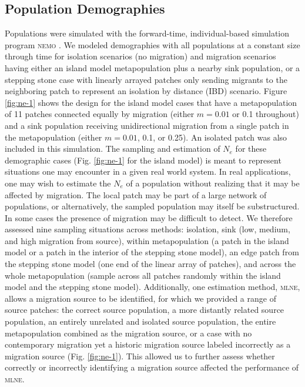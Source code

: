 \subsection{Population Demographies}
Populations were simulated with the forward-time, individual-based simulation program 
\textsc{nemo} \citep{Guillaume:2006}. We modeled demographies with all populations 
at a constant size through time for isolation scenarios (no migration) and migration scenarios 
having either an island model metapopulation plus a nearby sink population, or a stepping stone 
case with linearly arrayed patches only sending migrants to the neighboring patch to represent 
an isolation by distance (IBD) scenario. Figure \ref{fig:ne-1} shows the design for the island model cases 
that have a metapopulation of 11 patches connected equally by migration (either $m = 0.01$ or 0.1 throughout) 
and a sink population receiving unidirectional migration from a single patch in the metapopulation 
(either $m = 0.01$, 0.1, or 0.25). An isolated patch was also included in this simulation. The sampling 
and estimation of $N_e$ for these demographic cases (Fig. \ref{fig:ne-1} for the island model) is meant 
to represent situations one may encounter in a given real world system. In real applications, one 
may wish to estimate the $N_e$ of a population without realizing that it may be affected 
by migration. The local patch may be part of a large network of populations, or alternatively, the 
sampled population may itself be substructured. In some cases the presence of migration may be 
difficult to detect. We therefore assessed nine sampling situations across methods: isolation, 
sink (low, medium, and high migration from source), within metapopulation (a patch in the island 
model or a patch in the interior of the stepping stone model), an edge patch from the stepping 
stone model (one end of the linear array of patches), and across the whole metapopulation (sample 
across all patches randomly within the island model and the stepping stone model). Additionally, 
one estimation method, \textsc{mlne}, allows a migration source to be identified, for which we 
provided a range of source patches: the correct source population, a more distantly related source 
population, an entirely unrelated and isolated source population, the entire metapopulation combined 
as the migration source, or a case with no contemporary migration yet a historic migration source 
labeled incorrectly as a migration source (Fig. \ref{fig:ne-1}). This allowed us to further assess whether 
correctly or incorrectly identifying a migration source affected the performance of \textsc{mlne}.

